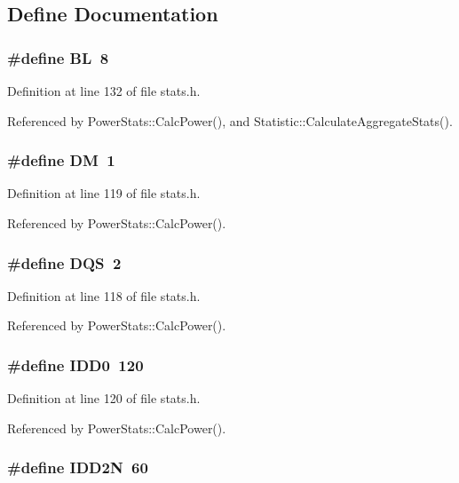 \subsection{Define Documentation}
\subsubsection[{BL}]{\setlength{\rightskip}{0pt plus 5cm}\#define BL~8}\label{stats_8h_d567ea9864a3046e47ab69cdc050ecfa}




Definition at line 132 of file stats.h.

Referenced by PowerStats::CalcPower(), and Statistic::CalculateAggregateStats().
\subsubsection[{DM}]{\setlength{\rightskip}{0pt plus 5cm}\#define DM~1}\label{stats_8h_9a9aac904e687286501946469e2903d6}




Definition at line 119 of file stats.h.

Referenced by PowerStats::CalcPower().
\subsubsection[{DQS}]{\setlength{\rightskip}{0pt plus 5cm}\#define DQS~2}\label{stats_8h_2ed01491cb4167104350262d51906b9f}




Definition at line 118 of file stats.h.

Referenced by PowerStats::CalcPower().
\subsubsection[{IDD0}]{\setlength{\rightskip}{0pt plus 5cm}\#define IDD0~120}\label{stats_8h_c5d55bab190c738b63e338bad3e3ca3a}




Definition at line 120 of file stats.h.

Referenced by PowerStats::CalcPower().
\subsubsection[{IDD2N}]{\setlength{\rightskip}{0pt plus 5cm}\#define IDD2N~60}\label{stats_8h_a7065efe3389eee833eb071f3bf9bfac}




